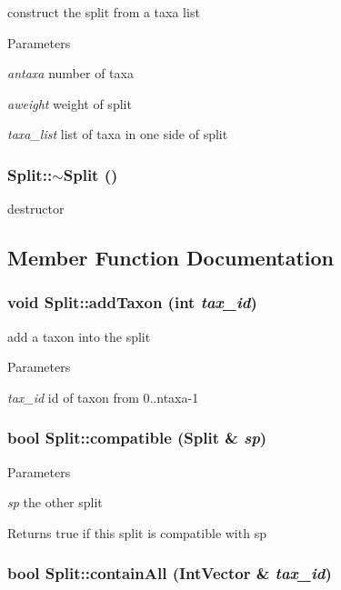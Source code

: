 construct the split from a taxa list 
\begin{DoxyParams}{Parameters}
\item[{\em antaxa}]number of taxa \item[{\em aweight}]weight of split \item[{\em taxa\_\-list}]list of taxa in one side of split \end{DoxyParams}
\hypertarget{classSplit_a32ae47628734299802a079d19b70fc0a}{
\subsubsection[{$\sim$Split}]{\setlength{\rightskip}{0pt plus 5cm}Split::$\sim$Split ()}}
\label{classSplit_a32ae47628734299802a079d19b70fc0a}
destructor 

\subsection{Member Function Documentation}
\hypertarget{classSplit_a35b159b165b623a7ee1d33bab6a1368f}{
\subsubsection[{addTaxon}]{\setlength{\rightskip}{0pt plus 5cm}void Split::addTaxon (int {\em tax\_\-id})}}
\label{classSplit_a35b159b165b623a7ee1d33bab6a1368f}
add a taxon into the split 
\begin{DoxyParams}{Parameters}
\item[{\em tax\_\-id}]id of taxon from 0..ntaxa-\/1 \end{DoxyParams}
\hypertarget{classSplit_afbf535c1d11bf7651ecd733045f2d688}{
\subsubsection[{compatible}]{\setlength{\rightskip}{0pt plus 5cm}bool Split::compatible ({\bf Split} \& {\em sp})}}
\label{classSplit_afbf535c1d11bf7651ecd733045f2d688}

\begin{DoxyParams}{Parameters}
\item[{\em sp}]the other split \end{DoxyParams}
\begin{DoxyReturn}{Returns}
true if this split is compatible with sp 
\end{DoxyReturn}
\hypertarget{classSplit_aaac9e8b488cf55b0d92bee3687abf40e}{
\subsubsection[{containAll}]{\setlength{\rightskip}{0pt plus 5cm}bool Split::containAll (IntVector \& {\em tax\_\-id})}}
\label{classSplit_aaac9e8b488cf55b0d92bee3687abf40e}

